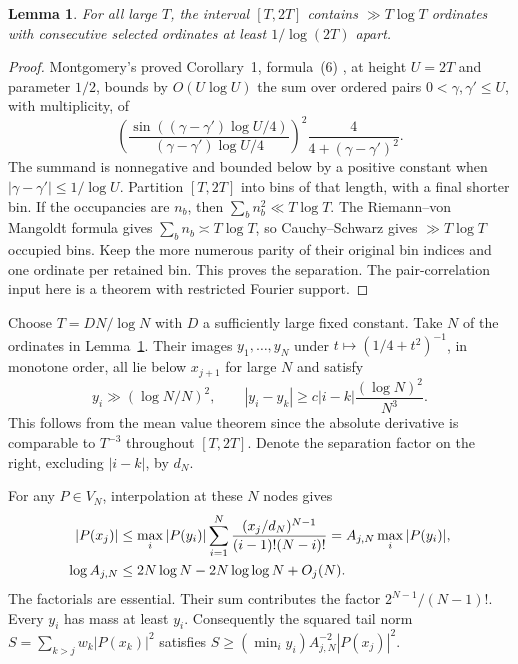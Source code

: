 \documentclass[11pt]{article}
\newtheorem{lemma}[theorem]{Lemma}
\begin{document}
\begin{lemma}\label{lem:packing}
For all large $T$, the interval $[T,2T]$ contains $\gg T\log T$ ordinates with consecutive selected ordinates at least $1/\log(2T)$ apart.
\end{lemma}
\begin{proof}
Montgomery's proved Corollary~1, formula~(6) \cite{mont}, at height $U=2T$ and parameter $1/2$, bounds by $O(U\log U)$ the sum over ordered pairs $0<\gamma,\gamma'\le U$, with multiplicity, of
\[
 \left(\frac{\sin((\gamma-\gamma')\log U/4)}{(\gamma-\gamma')\log U/4}\right)^2
 \frac{4}{4+(\gamma-\gamma')^2}.
\]
The summand is nonnegative and bounded below by a positive constant when $|\gamma-\gamma'|\le1/\log U$. Partition $[T,2T]$ into bins of that length, with a final shorter bin. If the occupancies are $n_b$, then $\sum_b n_b^2\ll T\log T$. The Riemann--von Mangoldt formula gives $\sum_b n_b\asymp T\log T$, so Cauchy--Schwarz gives $\gg T\log T$ occupied bins. Keep the more numerous parity of their original bin indices and one ordinate per retained bin. This proves the separation. The pair-correlation input here is a theorem with restricted Fourier support.
\end{proof}

Choose $T=D N/\log N$ with $D$ a sufficiently large fixed constant. Take $N$ of the ordinates in Lemma~\ref{lem:packing}. Their images $y_1,\ldots,y_N$ under $t\mapsto(1/4+t^2)^{-1}$, in monotone order, all lie below $x_{j+1}$ for large $N$ and satisfy
\begin{equation}
 y_i\gg (\log N/N)^2,\qquad |y_i-y_k|\ge c|i-k|\frac{(\log N)^2}{N^3}.
 \label{eq:sep}
\end{equation}
This follows from the mean value theorem since the absolute derivative is comparable to $T^{-3}$ throughout $[T,2T]$. Denote the separation factor on the right, excluding $|i-k|$, by $d_N$.

For any $P\in V_N$, interpolation at these $N$ nodes gives
\begin{align}
 |P(x_j)|&\le \max_i|P(y_i)|
   \sum_{i=1}^N\frac{(x_j/d_N)^{N-1}}{(i-1)!(N-i)!}
   = A_{j,N}\max_i|P(y_i)|,\label{eq:interp}\\
 \log A_{j,N}&\le 2N\log N-2N\log\log N+O_j(N).\notag
\end{align}
The factorials are essential. Their sum contributes the factor $2^{N-1}/(N-1)!$. Every $y_i$ has mass at least $y_i$. Consequently the squared tail norm $S=\sum_{k>j}w_k|P(x_k)|^2$ satisfies $S\ge (\min_i y_i) A_{j,N}^{-2}|P(x_j)|^2$.
\end{document}
